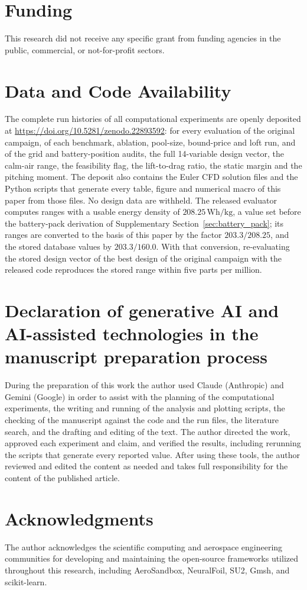 \documentclass[3p,times]{elsarticle}
\begin{document}
\section*{Funding}
This research did not receive any specific grant from funding agencies in the public, commercial, or not-for-profit sectors.

\section*{Data and Code Availability}
The complete run histories of all computational experiments are openly deposited at \url{https://doi.org/10.5281/zenodo.22893592}: for every evaluation of the original campaign, of each benchmark, ablation, pool-size, bound-price and loft run, and of the grid and battery-position audits, the full 14-variable design vector, the calm-air range, the feasibility flag, the lift-to-drag ratio, the static margin and the pitching moment. The deposit also contains the Euler CFD solution files and the Python scripts that generate every table, figure and numerical macro of this paper from those files. No design data are withheld. The released evaluator computes ranges with a usable energy density of $208.25\,\mathrm{Wh/kg}$, a value set before the battery-pack derivation of Supplementary Section~\ref{sec:battery_pack}; its ranges are converted to the basis of this paper by the factor $203.3/208.25$, and the stored database values by $203.3/160.0$. With that conversion, re-evaluating the stored design vector of the best design of the original campaign with the released code reproduces the stored range within five parts per million.

\section*{Declaration of generative AI and AI-assisted technologies in the manuscript preparation process}
During the preparation of this work the author used Claude (Anthropic) and Gemini (Google) in order to assist with the planning of the computational experiments, the writing and running of the analysis and plotting scripts, the checking of the manuscript against the code and the run files, the literature search, and the drafting and editing of the text. The author directed the work, approved each experiment and claim, and verified the results, including rerunning the scripts that generate every reported value. After using these tools, the author reviewed and edited the content as needed and takes full responsibility for the content of the published article.

\section*{Acknowledgments}
The author acknowledges the scientific computing and aerospace engineering communities for developing and maintaining the open-source frameworks utilized throughout this research, including AeroSandbox, NeuralFoil, SU2, Gmsh, and scikit-learn.



\end{document}
